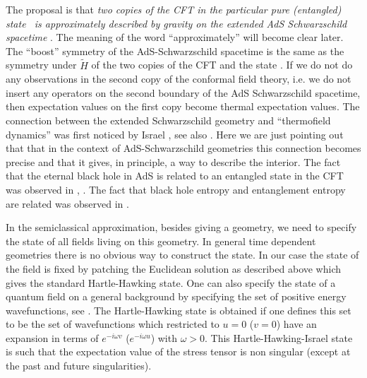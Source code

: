 The proposal is that {\it two copies of the CFT in the particular pure
(entangled) state \wavefunction\  is approximately described by 
gravity on the extended AdS Schwarzschild spacetime }. 
The meaning of the word ``approximately'' will become clear later. 
The ``boost'' symmetry of the AdS-Schwarzschild spacetime is the same
as the symmetry under $\tilde H$ of the two copies of the CFT and the
state \wavefunction . 
If we do not do any observations in the second copy of the conformal 
field theory, i.e. we do not insert any operators on the second boundary
of the AdS Schwarzschild spacetime, then  expectation values on the 
first copy become thermal expectation values. The connection between
the  extended Schwarzschild geometry 
and ``thermofield dynamics'' was first noticed 
by Israel \israel , see also .
Here we are just pointing out that that in the
context of AdS-Schwarzschild geometries this connection 
becomes precise and that it gives, in principle, 
 a way to describe the interior. 
The fact that  the eternal black hole in AdS is related to an entangled 
state in the CFT was  observed in \hm ,  \vijaytrivedi .
The fact that black hole entropy and
entanglement entropy are related 
was observed in .



In the semiclassical approximation, besides giving a geometry, we 
need to specify the state of all fields living on this geometry. 
In general time dependent geometries 
there is no obvious way to construct the state. In our case
the state of the field  is fixed by patching
the Euclidean solution as described above which gives the standard
Hartle-Hawking state. 
 One can also specify the state of a quantum field
on a general background by specifying the set of positive energy
wavefunctions, see \curvedqft . 
The Hartle-Hawking state is obtained if one defines this
set to be the set of wavefunctions which  restricted to 
$u=0$ ($v=0$)  have an expansion in terms of $e^{ - i \omega v} $
($e^{-i\omega u}$) with $ \omega >0$. 
This Hartle-Hawking-Israel state is such that the 
expectation value of the stress tensor is non singular  (except at the 
past and future singularities). 

